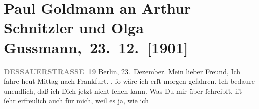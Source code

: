 

         
         \renewcommand{\erwaehntePersonen}{Personen: Josef Rosengart, Olga Schnitzler, Heinrich Schnitzler}
         \renewcommand{\erwaehnteOrte}{Orte: Berlin, Dessauer Straße, Deutsches Theater Berlin, Frankfurt am Main, Reuterweg, Wien}
         \renewcommand{\erwaehnteWerke}{Werke: Die Frau mit dem Dolche, Die letzten Masken, Lebendige Stunden, Lebendige Stunden. Vier Einakter}
               \section[ Paul Goldmann an Arthur Schnitzler und Olga Gussmann, 23. 12. {[}1901{]}]{ Paul Goldmann an Arthur Schnitzler und Olga
               Gussmann, 23. 12. {[}1901{]}}\nopagebreak{}\rehead{ }\begin{ledgroupsized}[t]{13cm}\normalsize\beginnumbering \toendnotes[C]{\smallbreak\pagebreak[2]} 
\toendnotes[C]{\smallbreak}\pstart
           \noindent{}\raggedleft{}{\pb}\textcolor{gray}{\textbf{DESSAUERSTRASSE 19}}\pend
           \pstart
           Berlin, 23. Dezember.\pend
           \pstart\center{}Mein lieber Freund,\pend\pstart
           Ich fahre heut{ }Mittag nach Frankfurt. \label{K_L03097-1v}\label{K_L03097-1h}, ſo wäre ich erſt morgen gefahren. Ich bedaure
               unendlich, daß ich Dich jetzt nicht ſehen kann.\pend
           \pstart
           Was Du mir über \label{K_L03097-2v}\label{K_L03097-2h} ſchreibſt, iſt ſehr erfreulich auch für mich, weil es ja, wie ich

\end{ledgroupsized}
